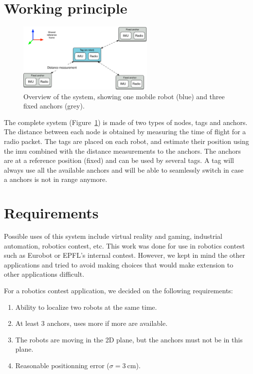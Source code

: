 \documentclass[a4paper, 12pt]{scrreprt}
\begin{document}
\section{Working principle}

\begin{figure}[h!]
    \centering
    \includegraphics[width=0.6\textwidth]{figures/system.pdf}
    \caption{Overview of the system, showing one mobile robot (blue) and three fixed anchors (grey).}
    \label{fig:system}
\end{figure}

The complete system (Figure~\ref{fig:system}) is made of two types of nodes, tags and anchors.
The distance between each node is obtained by measuring the time of flight for a radio packet.
The tags are placed on each robot, and estimate their position using the \gls{imu} combined with the distance measurements to the anchors.
The anchors are at a reference position (fixed) and can be used by several tags.
A tag will always use all the available anchors and will be able to seamlessly switch in case a anchors is not in range anymore.

\section{Requirements}

Possible uses of this system include virtual reality and gaming, industrial automation, robotics contest, etc.
This work was done for use in robotics contest such as Eurobot or EPFL's internal contest.
However, we kept in mind the other applications and tried to avoid making choices that would make extension to other applications difficult.

For a robotics contest application, we decided on the following requirements:

\begin{enumerate}
    \item Ability to localize two robots at the same time.
    \item At least 3 anchors, uses more if more are available.
    \item The robots are moving in the 2D plane, but the anchors must not be in this plane.
    \item Reasonable positionning error ($\sigma=\SI{3}{\centi\meter}$).
\end{enumerate}
\end{document}
